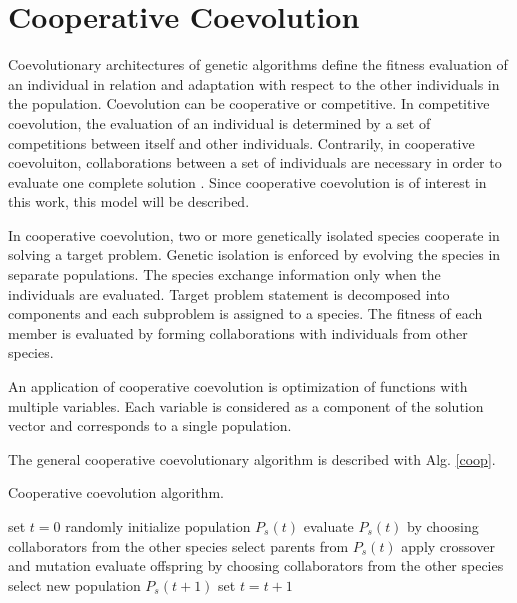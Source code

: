 \section{Cooperative Coevolution}
Coevolutionary architectures of genetic algorithms define the fitness evaluation of an individual in relation and adaptation with respect to the other individuals in the population. 
Coevolution can be cooperative or competitive. 
In competitive coevolution, the evaluation of an individual is determined by a set of competitions between itself and other individuals. 
Contrarily, in cooperative coevoluiton, collaborations between a set of individuals are necessary in order to evaluate one complete solution \cite{stoean2014support}. 
Since cooperative coevolution is of interest in this work, this model will be described. 

In cooperative coevolution, two or more genetically isolated species cooperate in solving a target problem. 
Genetic isolation is enforced by evolving the species in separate populations. 
The species exchange information only when the individuals are evaluated. 
Target problem statement is decomposed into components and each subproblem is assigned to a species. 
The fitness of each member is evaluated by forming collaborations with individuals from other species. 

An application of cooperative coevolution is optimization of functions with multiple variables. 
Each variable is considered as a component of the solution vector and corresponds to a single population. 

The general cooperative coevolutionary algorithm is described with Alg. \ref{coop}.

\begin{algorithm}
\caption{Cooperative coevolution algorithm.\label{coop}}
\begin{algorithmic}[1]
\State set $t=0$
\State randomly initialize population $P_s(t)$
\EndFor
{}
\State evaluate $P_s(t)$ by choosing collaborators from the other species
\EndFor
{}
\State select parents from $P_s(t)$
\State apply crossover and mutation
\State evaluate offspring by choosing collaborators from the other species
\State select new population $P_s(t+1)$
\EndFor
\State set $t=t+1$
\EndWhile
\end{algorithmic}
\end{algorithm}

